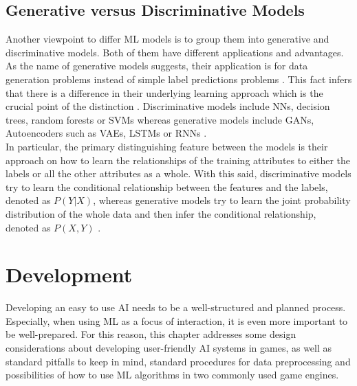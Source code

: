 \documentclass[MGS,Master,english]{twbook}%
\begin{document}
\subsection{Generative versus Discriminative Models}
Another viewpoint to differ ML models is to group them into generative and discriminative models. Both of them have different applications and advantages. As the name of generative models suggests, their application is for data generation problems instead of simple label predictions problems \cite{ml::book::nnProgrammingTF}. This fact infers that there is a difference in their underlying learning approach which is the crucial point of the distinction \cite{ml::book::nnProgrammingTF}. Discriminative models include \acp{NN}, decision trees, random forests or \acp{SVM} whereas generative models include \acp{GAN}, Autoencoders such as \acp{VAE}, \acp{LSTM} or \acp{RNN} \cite{ml::book::nnProgrammingTF}. \\
In particular, the primary distinguishing feature between the models is their approach on how to learn the relationships of the training attributes to either the labels or all the other attributes as a whole. With this said, discriminative models try to learn the conditional relationship between the features and the labels, denoted as $P(Y|X)$, whereas generative models try to learn the joint probability distribution of the whole data and then infer the conditional relationship, denoted as $P(X,Y)$ \cite{ml::book::nnProgrammingTF}.

\section{Development} \label{mlDevelopment}
Developing an easy to use AI needs to be a well-structured and planned process. Especially, when using ML as a focus of interaction, it is even more important to be well-prepared. For this reason, this chapter addresses some design considerations about developing user-friendly AI systems in games, as well as standard pitfalls to keep in mind, standard procedures for data preprocessing and possibilities of how to use ML algorithms in two commonly used game engines.
\end{document}
